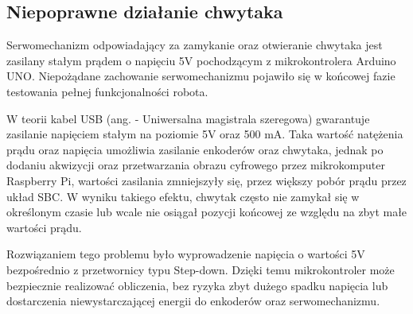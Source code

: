 \subsection{Niepoprawne działanie chwytaka}

Serwomechanizm odpowiadający za zamykanie oraz otwieranie chwytaka jest zasilany stałym prądem o napięciu 5V pochodzącym z mikrokontrolera Arduino UNO. Niepożądane zachowanie serwomechanizmu pojawiło się w końcowej fazie testowania pełnej funkcjonalności robota. 

W teorii kabel USB (ang.  - Uniwersalna magistrala szeregowa) gwarantuje zasilanie napięciem stałym na poziomie 5V oraz 500 mA. Taka wartość natężenia prądu oraz napięcia umożliwia zasilanie enkoderów oraz chwytaka, jednak po dodaniu akwizycji oraz przetwarzania obrazu cyfrowego przez mikrokomputer Raspberry Pi, wartości zasilania zmniejszyły się, przez większy pobór prądu przez układ SBC. W wyniku takiego efektu, chwytak często nie zamykał się w określonym czasie lub wcale nie osiągał pozycji końcowej ze względu na zbyt małe wartości prądu. 

Rozwiązaniem tego problemu było wyprowadzenie napięcia o wartości 5V bezpośrednio z przetwornicy typu Step-down. Dzięki temu mikrokontroler może bezpiecznie realizować obliczenia, bez ryzyka zbyt dużego spadku napięcia lub dostarczenia niewystarczającej energii do enkoderów oraz serwomechanizmu. 
